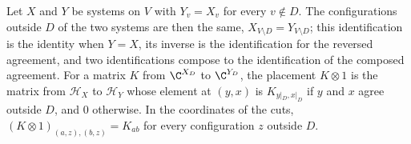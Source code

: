 \begin{definition}
    \label{def:sites_place_between}
    \leanok
    Let $X$ and $Y$ be systems on $V$ with $Y_v=X_v$ for every $v\notin D$. The
    configurations outside $D$ of the two systems are then the same,
    $X_{V\setminus D}=Y_{V\setminus D}$; this identification is the identity when
    $Y=X$, its inverse is the identification for the reversed agreement, and two
    identifications compose to the identification of the composed agreement. For a
    matrix $K$ from $\C^{X_D}$ to $\C^{Y_D}$, the placement $K\otimes1$ is the
    matrix from $\mathcal H_X$ to $\mathcal H_Y$ whose element at $(y,x)$ is
    $K_{y|_D,x|_D}$ if $y$ and $x$ agree outside $D$, and $0$ otherwise. In the
    coordinates of the cuts, $(K\otimes1)_{(a,z),(b,z)}=K_{ab}$ for every
    configuration $z$ outside $D$.
\end{definition}

